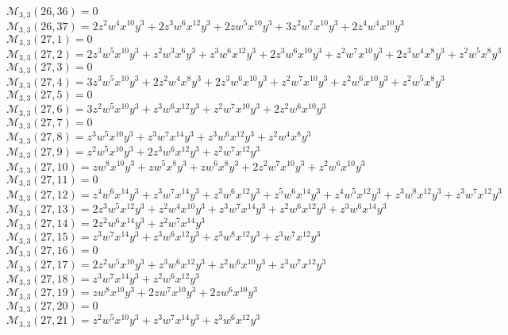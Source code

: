 $\mathcal{M}_{3,3}(26,36)=0$\\
$\mathcal{M}_{3,3}(26,37)=2z^2w^4x^{10}y^3+2z^3w^6x^{12}y^3+2zw^5x^{10}y^3+3z^2w^7x^{10}y^3+2z^4w^4x^{10}y^3$\\
$\mathcal{M}_{3,3}(27,1)=0$\\
$\mathcal{M}_{3,3}(27,2)=2z^3w^5x^{10}y^3+z^2w^3x^6y^3+z^3w^6x^{12}y^3+2z^3w^6x^{10}y^3+z^2w^7x^{10}y^3+2z^3w^4x^8y^3+z^2w^5x^8y^3$\\
$\mathcal{M}_{3,3}(27,3)=0$\\
$\mathcal{M}_{3,3}(27,4)=3z^3w^5x^{10}y^3+2z^2w^4x^8y^3+2z^3w^6x^{10}y^3+z^2w^7x^{10}y^3+z^2w^6x^{10}y^3+z^2w^5x^8y^3$\\
$\mathcal{M}_{3,3}(27,5)=0$\\
$\mathcal{M}_{3,3}(27,6)=3z^2w^5x^{10}y^3+z^3w^6x^{12}y^3+z^2w^7x^{10}y^3+2z^2w^6x^{10}y^3$\\
$\mathcal{M}_{3,3}(27,7)=0$\\
$\mathcal{M}_{3,3}(27,8)=z^3w^5x^{10}y^3+z^3w^7x^{14}y^3+z^3w^6x^{12}y^3+z^2w^4x^8y^3$\\
$\mathcal{M}_{3,3}(27,9)=z^2w^5x^{10}y^3+2z^3w^6x^{12}y^3+z^2w^7x^{12}y^3$\\
$\mathcal{M}_{3,3}(27,10)=zw^8x^{10}y^3+zw^5x^8y^3+zw^6x^8y^3+2z^2w^7x^{10}y^3+z^2w^6x^{10}y^3$\\
$\mathcal{M}_{3,3}(27,11)=0$\\
$\mathcal{M}_{3,3}(27,12)=z^4w^6x^{14}y^3+z^3w^7x^{14}y^3+z^3w^6x^{12}y^3+z^5w^6x^{14}y^3+z^4w^5x^{12}y^3+z^3w^8x^{12}y^3+z^3w^7x^{12}y^3$\\
$\mathcal{M}_{3,3}(27,13)=2z^3w^5x^{12}y^3+z^2w^4x^{10}y^3+z^3w^7x^{14}y^3+z^2w^6x^{12}y^3+z^3w^6x^{14}y^3$\\
$\mathcal{M}_{3,3}(27,14)=2z^2w^6x^{14}y^3+z^2w^7x^{14}y^3$\\
$\mathcal{M}_{3,3}(27,15)=z^3w^7x^{14}y^3+z^3w^6x^{12}y^3+z^3w^8x^{12}y^3+z^3w^7x^{12}y^3$\\
$\mathcal{M}_{3,3}(27,16)=0$\\
$\mathcal{M}_{3,3}(27,17)=2z^2w^5x^{10}y^3+z^3w^6x^{12}y^3+z^2w^6x^{10}y^3+z^3w^7x^{12}y^3$\\
$\mathcal{M}_{3,3}(27,18)=z^3w^7x^{14}y^3+z^2w^6x^{12}y^3$\\
$\mathcal{M}_{3,3}(27,19)=zw^8x^{10}y^3+2zw^7x^{10}y^3+2zw^6x^{10}y^3$\\
$\mathcal{M}_{3,3}(27,20)=0$\\
$\mathcal{M}_{3,3}(27,21)=z^2w^5x^{10}y^3+z^3w^7x^{14}y^3+z^3w^6x^{12}y^3$\\

